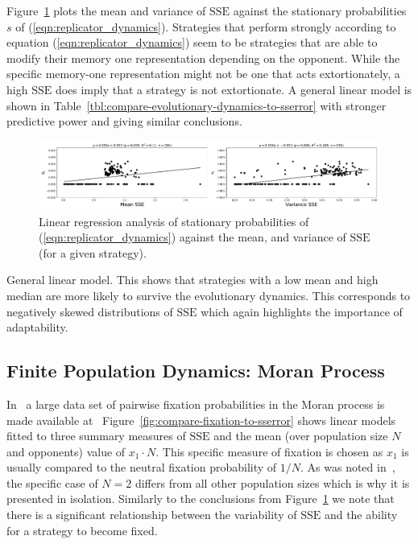 \documentclass[a4paper]{article}
\newcommand{\SSe}{\text{SSE}}
\begin{document}
Figure~\ref{fig:compare-evolutionary-dynamics-to-sserror} plots the mean and
variance of \(\SSe\) against the stationary
probabilities \(s\) of (\ref{eqn:replicator_dynamics}). Strategies that perform
strongly according to equation
(\ref{eqn:replicator_dynamics}) seem to be strategies that are able to modify
their memory one representation depending on the opponent. While the specific
memory-one representation might not be one that acts extortionately, a high
\(\SSe\) does imply that a strategy is not extortionate. A general linear
model is shown in Table~\ref{tbl:compare-evolutionary-dynamics-to-sserror} with
stronger predictive power and giving similar conclusions.

\begin{figure}[!hbtp]
    \centering
    \includegraphics[width=\textwidth]{./assets/img/compare-evolutionary-dynamics-to-sserror/main.pdf}
    \caption{Linear regression analysis of stationary probabilities of
    (\ref{eqn:replicator_dynamics}) against the mean, and variance
    of \(\SSe\) (for a given strategy).}
    \label{fig:compare-evolutionary-dynamics-to-sserror}
\end{figure}

\begin{table}[!hbtp]
    \begin{center}
    \tiny
    
    \end{center}
    \caption{General linear model. This shows that strategies with a low mean
    and high median are more likely to survive the evolutionary dynamics. This
    corresponds to negatively skewed distributions of \(\SSe\) which again
    highlights the importance of adaptability.}
    \label{tbl:compare-evolutionary-dynamics-to-sserror}
\end{table}

\subsection{Finite Population Dynamics: Moran Process}

In~\cite{Moran1707} a large data set of pairwise fixation probabilities in the
Moran process is made available at~\cite{vincent_knight_2017_1040129}
Figure~\ref{fig:compare-fixation-to-sserror} shows linear models fitted to three
summary measures of \(\SSe\) and the mean (over population size \(N\) and
opponents) value of \(x_1\cdot N\). This specific measure of fixation is chosen
as \(x_1\) is usually compared to the neutral fixation probability of \(1 / N\).
As was noted in~\cite{Moran1707}, the specific case of \(N=2\) differs from all
other population sizes which is why it is presented in isolation. Similarly to
the conclusions from Figure~\ref{fig:compare-evolutionary-dynamics-to-sserror}
we note that there is a significant relationship between the variability of
\(\SSe\) and the ability for a strategy to become fixed.
\end{document}
